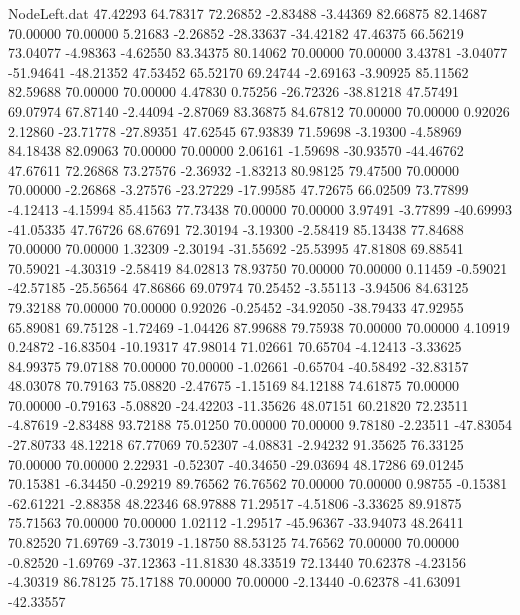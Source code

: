 \begin{filecontents}{NodeLeft.dat}
  47.42293   64.78317   72.26852    -2.83488   -3.44369   82.66875   82.14687   70.00000   70.00000    5.21683   -2.26852  -28.33637  -34.42182
  47.46375   66.56219   73.04077    -4.98363   -4.62550   83.34375   80.14062   70.00000   70.00000    3.43781   -3.04077  -51.94641  -48.21352
  47.53452   65.52170   69.24744    -2.69163   -3.90925   85.11562   82.59688   70.00000   70.00000    4.47830    0.75256  -26.72326  -38.81218
  47.57491   69.07974   67.87140    -2.44094   -2.87069   83.36875   84.67812   70.00000   70.00000    0.92026    2.12860  -23.71778  -27.89351
  47.62545   67.93839   71.59698    -3.19300   -4.58969   84.18438   82.09063   70.00000   70.00000    2.06161   -1.59698  -30.93570  -44.46762
  47.67611   72.26868   73.27576    -2.36932   -1.83213   80.98125   79.47500   70.00000   70.00000   -2.26868   -3.27576  -23.27229  -17.99585
  47.72675   66.02509   73.77899    -4.12413   -4.15994   85.41563   77.73438   70.00000   70.00000    3.97491   -3.77899  -40.69993  -41.05335
  47.76726   68.67691   72.30194    -3.19300   -2.58419   85.13438   77.84688   70.00000   70.00000    1.32309   -2.30194  -31.55692  -25.53995
  47.81808   69.88541   70.59021    -4.30319   -2.58419   84.02813   78.93750   70.00000   70.00000    0.11459   -0.59021  -42.57185  -25.56564
  47.86866   69.07974   70.25452    -3.55113   -3.94506   84.63125   79.32188   70.00000   70.00000    0.92026   -0.25452  -34.92050  -38.79433
  47.92955   65.89081   69.75128    -1.72469   -1.04426   87.99688   79.75938   70.00000   70.00000    4.10919    0.24872  -16.83504  -10.19317
  47.98014   71.02661   70.65704    -4.12413   -3.33625   84.99375   79.07188   70.00000   70.00000   -1.02661   -0.65704  -40.58492  -32.83157
  48.03078   70.79163   75.08820    -2.47675   -1.15169   84.12188   74.61875   70.00000   70.00000   -0.79163   -5.08820  -24.42203  -11.35626
  48.07151   60.21820   72.23511    -4.87619   -2.83488   93.72188   75.01250   70.00000   70.00000    9.78180   -2.23511  -47.83054  -27.80733
  48.12218   67.77069   70.52307    -4.08831   -2.94232   91.35625   76.33125   70.00000   70.00000    2.22931   -0.52307  -40.34650  -29.03694
  48.17286   69.01245   70.15381    -6.34450   -0.29219   89.76562   76.76562   70.00000   70.00000    0.98755   -0.15381  -62.61221   -2.88358
  48.22346   68.97888   71.29517    -4.51806   -3.33625   89.91875   75.71563   70.00000   70.00000    1.02112   -1.29517  -45.96367  -33.94073
  48.26411   70.82520   71.69769    -3.73019   -1.18750   88.53125   74.76562   70.00000   70.00000   -0.82520   -1.69769  -37.12363  -11.81830
  48.33519   72.13440   70.62378    -4.23156   -4.30319   86.78125   75.17188   70.00000   70.00000   -2.13440   -0.62378  -41.63091  -42.33557

\end{filecontents}
